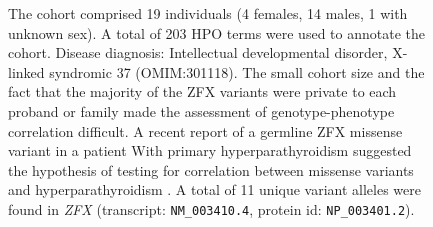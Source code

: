 \begin{figure}[htbp]
\vspace{2em}
\caption{ The cohort comprised 19 individuals (4 females, 14 males, 1 with unknown sex). A total of 203 HPO terms were used to annotate the cohort. Disease diagnosis: Intellectual developmental disorder, X-linked syndromic 37 (OMIM:301118). The small cohort size and the fact that the majority of the ZFX variants were private to each proband or 
family made the assessment of genotype-phenotype correlation difficult. A recent report of a
germline ZFX missense variant in a patient With primary hyperparathyroidism suggested the hypothesis of
testing for correlation between missense variants and hyperparathyroidism \cite{PMID_38325380,PMID_39056049}. A total of 11 unique variant alleles were found in \textit{ZFX} (transcript: \texttt{NM\_003410.4}, protein id: \texttt{NP\_003401.2}).}
\end{figure}
